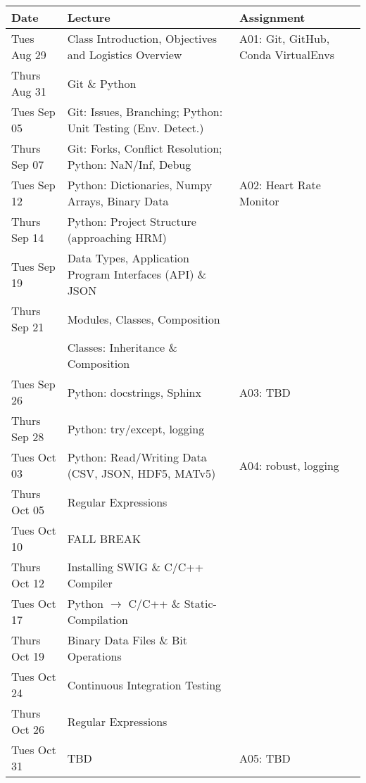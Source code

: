 \begin{longtable}[c]{|l|l|l|}

    \hline 
    
    \textbf{Date} & \textbf{Lecture} & \textbf{Assignment}\\

    \hline

    Tues Aug 29     & Class Introduction, Objectives and Logistics Overview & A01: Git, GitHub, Conda VirtualEnvs\\
    Thurs Aug 31    & Git \& Python & \\
    \hline
    Tues Sep 05     & Git: Issues, Branching; Python: Unit Testing (Env. Detect.)& \\
    Thurs Sep 07    & Git: Forks, Conflict Resolution; Python: NaN/Inf, Debug & \\
    \hline
    Tues Sep 12     & Python: Dictionaries, Numpy Arrays, Binary Data & A02: Heart Rate Monitor \\
    Thurs Sep 14    & Python: Project Structure (approaching HRM) & \\
    \hline
    Tues Sep 19     & Data Types, Application Program Interfaces (API) \& JSON & \\
    Thurs Sep 21    & Modules, Classes, Composition& \\
                    & Classes: Inheritance \& Composition & \\
    \hline
    Tues Sep 26     & Python: docstrings, Sphinx & A03: TBD\\
    Thurs Sep 28    & Python: try/except, logging & \\
    \hline
    Tues Oct 03     & Python: Read/Writing Data (CSV, JSON, HDF5, MATv5) & A04: robust, logging \\
    Thurs Oct 05    & Regular Expressions & \\
    \hline
    Tues Oct 10     & FALL BREAK & \\
    Thurs Oct 12    & Installing SWIG \& C/C++ Compiler & \\
    \hline
    Tues Oct 17     & Python $\rightarrow$ C/C++ \& Static-Compilation & \\
    Thurs Oct 19    & Binary Data Files \& Bit Operations & \\
    \hline
    Tues Oct 24     & Continuous Integration Testing & \\
    Thurs Oct 26    & Regular Expressions & \\
    \hline
    Tues Oct 31     & TBD & A05: TBD \\

\end{longtable}
